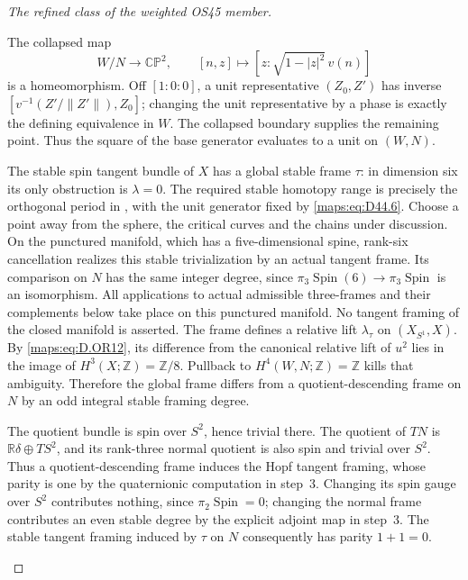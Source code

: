 \begin{proof}[The refined class of the weighted OS45 member]
\begin{enumerate}
The collapsed map
\[
 W/N\longrightarrow\mathbb{CP}^2,\qquad
 [n,z]\longmapsto[z:\sqrt{1-|z|^2}\,v(n)]
\]
is a homeomorphism.  Off $[1:0:0]$, a unit representative $(Z_0,Z')$
has inverse $[v^{-1}(Z'/\|Z'\|),Z_0]$; changing the unit representative
by a phase is exactly the defining equivalence in $W$.
The collapsed boundary supplies the remaining point.
Thus the square of the base generator evaluates to a unit on $(W,N)$.

The stable spin tangent bundle of $X$ has a global stable frame $\tau$:
in dimension six its only obstruction is $\lambda=0$.
The required stable homotopy range is precisely the orthogonal period
in \cite[Theorem~II and (1.5), pp.~314--315]{mapsBott59}, with the unit
generator fixed by \eqref{maps:eq:D44.6}.
Choose a point away from the sphere, the critical curves and the chains
under discussion.  On the punctured manifold, which has a
five-dimensional spine, rank-six cancellation realizes this stable
trivialization by an actual tangent frame.  Its comparison on $N$
has the same integer degree, since
$\pi_3\operatorname{Spin}(6)\to\pi_3\operatorname{Spin}$ is an isomorphism.
All applications to actual admissible three-frames and their complements
below take place on this punctured manifold.  No tangent framing of the
closed manifold is asserted.
The frame defines a relative lift $\lambda_\tau$ on $(X_{S^1},X)$.
By \eqref{maps:eq:D.OR12}, its difference from the canonical relative
lift of $u^2$ lies in the image of $H^3(X;\mathbb Z)=\mathbb Z/8$.
Pullback to $H^4(W,N;\mathbb Z)=\mathbb Z$ kills that ambiguity.
Therefore the global frame differs from a quotient-descending frame
on $N$ by an odd integral stable framing degree.

The quotient bundle is spin over $S^2$, hence trivial there.
The quotient of $TN$ is $\mathbb R\delta\oplus TS^2$, and its rank-three
normal quotient is also spin and trivial over $S^2$.
Thus a quotient-descending frame induces the Hopf tangent framing,
whose parity is one by the quaternionic computation in step~3.
Changing its spin gauge over $S^2$ contributes nothing, since
$\pi_2\operatorname{Spin}=0$; changing the normal frame contributes
an even stable degree by the explicit adjoint map in step~3.
The stable tangent framing induced by $\tau$ on $N$ consequently has
parity $1+1=0$.


\end{enumerate}
\end{proof}
